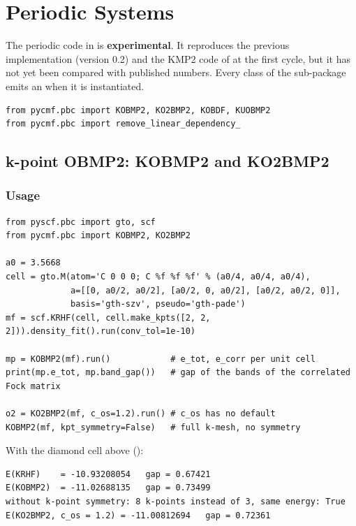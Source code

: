 \chapter{Periodic Systems}
\label{ch:periodic}

The periodic code in  is \textbf{experimental}. It
reproduces the previous implementation (version 0.2) and the KMP2 code of
\pyscf{} at the first cycle, but it has not yet been compared with published
numbers. Every class of the sub-package emits an 
when it is instantiated.

\begin{lstlisting}[style=python]
from pycmf.pbc import KOBMP2, KO2BMP2, KOBDF, KUOBMP2
from pycmf.pbc import remove_linear_dependency_
\end{lstlisting}

\section{k-point OBMP2: KOBMP2 and KO2BMP2}
\label{sec:kobmp2}

\subsection{Usage}

\begin{lstlisting}[style=python]
from pyscf.pbc import gto, scf
from pycmf.pbc import KOBMP2, KO2BMP2

a0 = 3.5668
cell = gto.M(atom='C 0 0 0; C %f %f %f' % (a0/4, a0/4, a0/4),
             a=[[0, a0/2, a0/2], [a0/2, 0, a0/2], [a0/2, a0/2, 0]],
             basis='gth-szv', pseudo='gth-pade')
mf = scf.KRHF(cell, cell.make_kpts([2, 2, 2])).density_fit().run(conv_tol=1e-10)

mp = KOBMP2(mf).run()            # e_tot, e_corr per unit cell
print(mp.e_tot, mp.band_gap())   # gap of the bands of the correlated Fock matrix

o2 = KO2BMP2(mf, c_os=1.2).run() # c_os has no default
KOBMP2(mf, kpt_symmetry=False)   # full k-mesh, no symmetry
\end{lstlisting}

With the diamond cell above ():

\begin{lstlisting}[style=output]
E(KRHF)    = -10.93208054   gap = 0.67421
E(KOBMP2)  = -11.02688135   gap = 0.73499
without k-point symmetry: 8 k-points instead of 3, same energy: True
E(KO2BMP2, c_os = 1.2) = -11.00812694   gap = 0.72361
\end{lstlisting}

